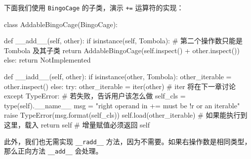 下面我们使用 \texttt{BingoCage} 的子类，演示 \texttt{+=} 运算符的实现：

\begin{python}
class AddableBingoCage(BingoCage):

    def __add__(self, other):
        if isinstance(self, Tombola):   # 第二个操作数只能是 Tombola 及其子类
            return AddableBingoCage(self.inspect() + other.inspect())
        else:
            return NotImplemented

    def __iadd__(self, other):
        if isinstance(other, Tombola):
            other_iterable = other.inspect()
        else:
            try:
                other_iterable = iter(other)    # iter 将在下一章讨论
            except TypeError:                   # 若失败，告诉用户该怎么做
                self_cls = type(self).__name__
                msg = "right operand in += must be {!r} or an iterable"
                raise TypeError(msg.format(self_cls))
        self.load(other_iterable)   # 如果能执行到这里，载入
        return self     # 增量赋值必须返回 self
\end{python}

此外，我们也无需实现 \texttt{\_\_radd\_\_} 方法，因为不需要。如果右操作数是相同类型，那么正向方法 \texttt{\_\_add\_\_} 会处理。

\newpage